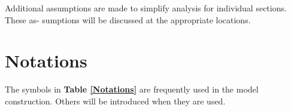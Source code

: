 \documentclass[12pt]{article}
\begin{document}




Additional assumptions are made to simplify analysis for individual sections. These as-
sumptions will be discussed at the appropriate locations.

\section{Notations}

The symbols  in  \textbf{Table \ref{Notations}} are frequently used in the model construction. Others will be introduced when they are used.
\end{document}
